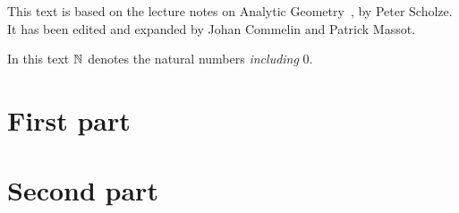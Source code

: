 \maketitle

\begin{remark}
	This text is based on the lecture notes on Analytic Geometry~\cite{Analytic}, by Peter Scholze.
  It has been edited and expanded by Johan Commelin and Patrick Massot.
\end{remark}

\begin{remark}
  In this text $\mathbb{N}$ denotes the natural numbers \emph{including} $0$.
\end{remark}



\section{First part}
\label{cha:one}









\section{Second part}
\label{cha:two}






